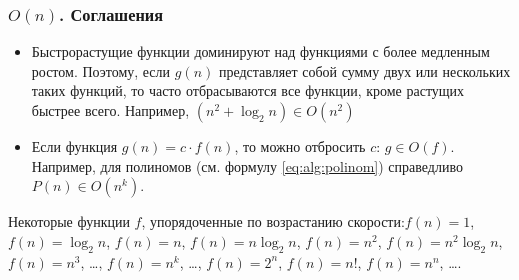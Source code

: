 \begin{frame}
    \frametitle{$O(n)$. Соглашения}
    
    \begin{itemize}
        \item Быстрорастущие функции доминируют над функциями с более медленным ростом. Поэтому, если $g(n)$ представляет собой сумму двух или нескольких таких функций, то часто отбрасываются все функции, кроме растущих быстрее всего. Например, $(n^2+\log_2n)\in O(n^2)$
        
        \item Если функция $g(n)=c\cdot f(n)$, то можно отбросить $c$: $g\in O(f)$. Например, для полиномов (см. формулу \eqref{eq:alg:polinom}) справедливо $P(n)\in O(n^k)$.
    \end{itemize}
    
    Некоторые функции $f$, упорядоченные по возрастанию скорости:$f(n)=1$, $f(n)=\log_2n$, $f(n)=n$, $f(n)=n\log_2n$, $f(n)=n^2$, $f(n)=n^2\log_2n$, $f(n)=n^3$, \ldots, $f(n)=n^k$, \ldots, $f(n)=2^n$, $f(n)=n!$, $f(n)=n^n$, \ldots.
\end{frame}

\begin{frame}
    \begin{center}
    \end{center}
\end{frame}

\begin{frame}
    \begin{algorithm}[H]
        \caption{$f(n)$}
        \begin{algorithmic}[1]
            \ENDWHILE
        \end{algorithmic}
    \end{algorithm}
\end{frame}

\begin{frame}
    \begin{algorithm}[H]
        \caption{$f(n)$}
        \begin{algorithmic}[1]
                \ENDWHILE
            \ENDWHILE
        \end{algorithmic}
    \end{algorithm}
\end{frame}

